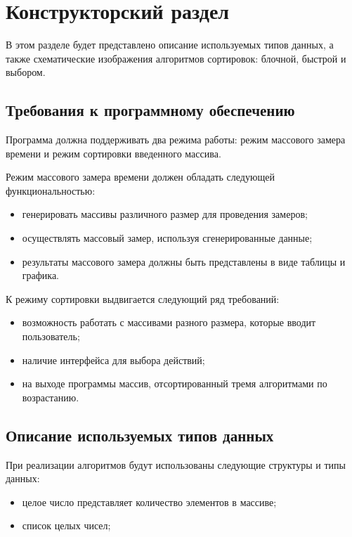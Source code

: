 \chapter{Конструкторский раздел}

В этом разделе будет представлено описание используемых типов данных, а также схематические изображения алгоритмов сортировок: блочной, быстрой и выбором.

\section{Требования к программному обеспечению}

Программа должна поддерживать два режима работы: режим массового замера времени и режим сортировки введенного массива.

Режим массового замера времени должен обладать следующей функциональностью:
\begin{itemize}
	\item генерировать массивы различного размер для проведения замеров;
	\item осуществлять массовый замер, используя сгенерированные данные;
	\item результаты массового замера должны быть представлены в виде таблицы и графика.
\end{itemize}

К режиму сортировки выдвигается следующий ряд требований:
\begin{itemize}
	\item возможность работать с массивами разного размера, которые вводит пользователь;
	\item наличие интерфейса для выбора действий;
	\item на выходе программы массив, отсортированный тремя алгоритмами по возрастанию.
\end{itemize}

\section{Описание используемых типов данных}

При реализации алгоритмов будут использованы следующие структуры и типы данных:
\begin{itemize}
	\item целое число представляет количество элементов в массиве;
	\item список целых чисел;
\end{itemize}

